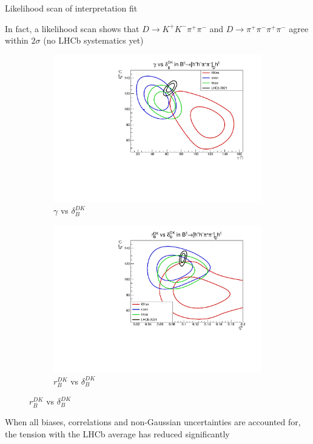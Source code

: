 \documentclass{beamer}
\begin{document}
\begin{frame}{Likelihood scan of interpretation fit}
  \begin{center}
    In fact, a likelihood scan shows that $D\to K^+K^-\pi^+\pi^-$ and $D\to\pi^+\pi^-\pi^+\pi^-$ agree within $2\sigma$ (no LHCb systematics yet)
  \end{center}
  \begin{figure}
    \centering
    \begin{subfigure}{0.50\textwidth}
      \centering
      \includegraphics[width=1.0\textwidth]{Plots/gamma_deltaB_hhpipi_LHCb_Prob_scan.pdf}
      \caption*{$\gamma$ vs $\delta_B^{DK}$}
    \end{subfigure}%
    \begin{subfigure}{0.50\textwidth}
      \centering
      \includegraphics[width=1.0\textwidth]{Plots/rB_deltaB_hhpipi_LHCb_Prob_scan.pdf}
      \caption*{$r_B^{DK}$ vs $\delta_B^{DK}$}
    \end{subfigure}
  \end{figure}
  \vspace{-0.3cm}
  \begin{center}
    When all biases, correlations and non-Gaussian uncertainties are accounted for, the tension with the LHCb average has reduced significantly
  \end{center}
\end{frame}
\end{document}
